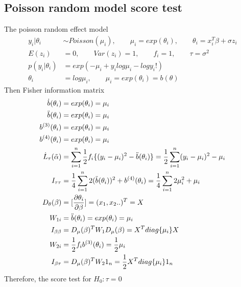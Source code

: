 \documentclass[11pt]{article} %
\begin{document}
\subsection{Poisson random model score test}
The poisson random effect model
\begin{align*}
	y_i|\theta_i & \sim Poisson(\mu_i), \qquad \mu_i = exp(\theta_i) ,\qquad \theta_i = x_i^T \beta + \sigma z_i\\
	E(z_i) &= 0, \qquad Var(z_i) = 1, \qquad f_i =1, \qquad \tau = \sigma^2\\
	p(y_i|\theta_i) &= exp(-\mu_i + y_i log \mu_i - log y_i!) \\
	\theta_i &= log \mu_i, \qquad \mu_i = exp(\theta_i) = b(\theta)
\end{align*}
Then Fisher information matrix
\begin{align*}
	\dot{b}(\theta_i) &= exp(\theta_i) = \mu_i\\
	\ddot{b}(\theta_i) &= exp(\theta_i) = \mu_i\\
	b^{(3)}(\theta_i) &= exp(\theta_i) = \mu_i\\
	b^{(4)}(\theta_i) &= exp(\theta_i) = \mu_i\\
	\dot{L}_{\tau}(\Tilde{\alpha}) &=  \sum_{i=1}^n \frac{1}{2} f_i\{ (y_i-\mu_i)^2- \ddot{b}(\theta_i)\}  =\frac{1}{2} \sum_{i=1}^n (y_i-\mu_i)^2- \mu_i \\
	I_{\tau\tau} &=\frac{1}{4} \sum_{i=1}^n 2 (\ddot{b}(\theta_i))^2 + b^{(4)}(\theta_i)= \frac{1}{4} \sum_{i=1}^n 2 \mu_i^2 + \mu_i  \\
	D_{\theta}(\beta) &= [\frac{\partial \theta_i}{\partial \beta}]= (x_1, x_2..)^T = X  \\
	W_{1i} &= \ddot{b}(\theta_i) = exp(\theta_i) = \mu_i\\
	I_{\beta \beta} &= D_{\mu}(\beta)^T  W_1 D_{\mu}(\beta) = X^T diag \{\mu_i\}X\\
	W_{2i} &= \frac{1}{2} f_i b^{(3)}(\theta_i) =\frac{1}{2} \mu_i \\
	I_{\beta \tau} &= D_{\mu}(\beta)^T W_2 1_n = \frac{1}{2} X^T diag\{ \mu_i\} 1_n
\end{align*}
Therefore, the score test for $H_0: \tau = 0$
\end{document}
